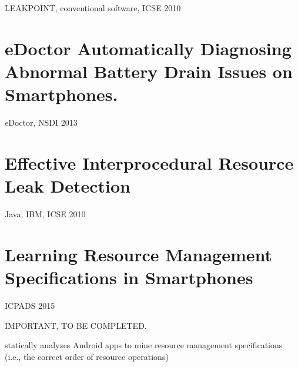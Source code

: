 \documentclass{article}
\begin{document}
LEAKPOINT, conventional software, ICSE 2010

\section{eDoctor Automatically Diagnosing Abnormal Battery Drain Issues on
  Smartphones.}

eDoctor, NSDI 2013

\section{Effective Interprocedural Resource Leak Detection}

Java, IBM, ICSE 2010

\section{Learning Resource Management Specifications in Smartphones}

ICPADS 2015

IMPORTANT, TO BE COMPLETED.

statically analyzes Android apps to mine resource management specifications
(i.e., the correct order of resource operations)
\end{document}
